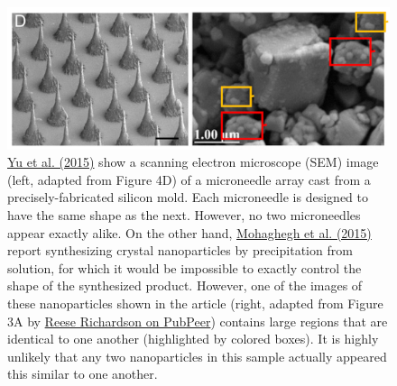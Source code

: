 \documentclass[letterpaper, 12pt]{article}
\begin{document}
\begin{figure}[h!tbp]
    \centering
    \includegraphics[width=\textwidth]{img/responses/yu_vs_mohaghegh_0.PNG}
    \caption*{\href{https://doi.org/10.1073/pnas.1505405112}{Yu et al. (2015)} show a scanning electron microscope (SEM) image (left, adapted from Figure 4D) of a microneedle array cast from a precisely-fabricated silicon mold. Each microneedle is designed to have the same shape as the next. However, no two microneedles appear exactly alike. On the other hand, \href{https://doi.org/10.1007/s10853-015-9003-3}{Mohaghegh et al. (2015)} report synthesizing crystal nanoparticles by precipitation from solution, for which it would be impossible to exactly control the shape of the synthesized product. However, one of the images of these nanoparticles shown in the article (right, adapted from Figure 3A by \href{https://pubpeer.com/publications/7BE7C2A93C385F700F1C6B5BC90294\#1}{Reese Richardson on PubPeer}) contains large regions that are identical to one another (highlighted by colored boxes). It is highly unlikely that any two nanoparticles in this sample actually appeared this similar to one another.}
\end{figure}
\end{document}
